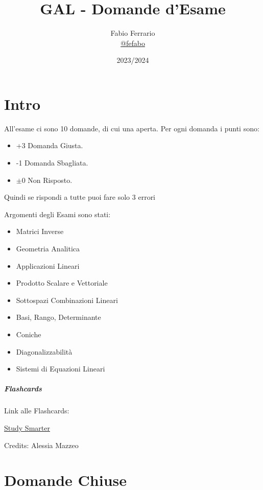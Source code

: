 \documentclass[12pt, a4paper, openany]{book}
\begin{document}
\title{GAL - Domande d'Esame}

\author{
	Fabio Ferrario\\
	\small{\href{https://t.me/fefabo}{@fefabo}}
}

\date{2023/2024}

\maketitle

\tableofcontents

\chapter{Intro}
All'esame ci sono 10 domande, di cui una aperta.
Per ogni domanda i punti sono:
\begin{itemize}
	\item +3 Domanda Giusta.
	\item -1 Domanda Sbagliata.
	\item $\pm$0 Non Risposto.
\end{itemize}
Quindi se rispondi a tutte puoi fare solo 3 errori


Argomenti degli Esami sono stati:
\begin{itemize}
	\item Matrici Inverse %
	\item Geometria Analitica %
	\item Applicazioni Lineari %
	\item Prodotto Scalare e Vettoriale %
	\item Sottospazi Combinazioni Lineari %
	\item Basi, Rango, Determinante %
	\item Coniche %
	\item Diagonalizzabilità %
	\item Sistemi di Equazioni Lineari %
\end{itemize}

\paragraph{Flashcards} Link alle Flashcards:
\begin{center}
	\href{https://app.studysmarter.de/studyset/20458421}{Study Smarter}
\end{center}
Credits: Alessia Mazzeo

\chapter{Domande Chiuse}
\end{document}
